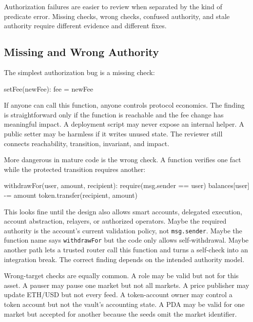 Authorization failures are easier to review when separated by the kind of predicate error. Missing checks, wrong checks, confused authority, and stale authority require different evidence and different fixes.

\subsection{Missing and Wrong Authority}

The simplest authorization bug is a missing check:

\begin{codeblock}
setFee(newFee):
    fee = newFee
\end{codeblock}

If anyone can call this function, anyone controls protocol economics. The finding is straightforward only if the function is reachable and the fee change has meaningful impact. A deployment script may never expose an internal helper. A public setter may be harmless if it writes unused state. The reviewer still connects reachability, transition, invariant, and impact.

More dangerous in mature code is the wrong check. A function verifies one fact while the protected transition requires another:

\begin{codeblock}
withdrawFor(user, amount, recipient):
    require(msg.sender == user)
    balances[user] -= amount
    token.transfer(recipient, amount)
\end{codeblock}

This looks fine until the design also allows smart accounts, delegated execution, account abstraction, relayers, or authorized operators. Maybe the required authority is the account's current validation policy, not \texttt{msg.sender}. Maybe the function name says \texttt{withdrawFor} but the code only allows self-withdrawal. Maybe another path lets a trusted router call this function and turns a self-check into an integration break. The correct finding depends on the intended authority model.

Wrong-target checks are equally common. A role may be valid but not for this asset. A pauser may pause one market but not all markets. A price publisher may update ETH/USD but not every feed. A token-account owner may control a token account but not the vault's accounting state. A PDA may be valid for one market but accepted for another because the seeds omit the market identifier.

